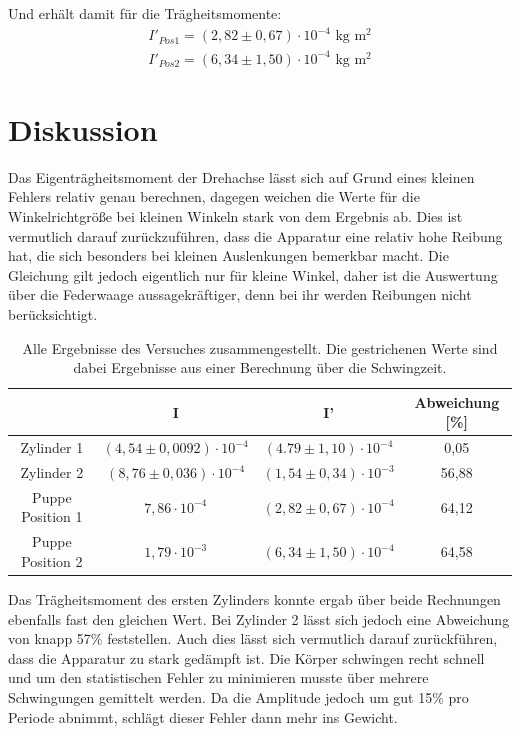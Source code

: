 Und erhält damit für die Trägheitsmomente:
\begin{align*}
I'_{Pos 1}=(2,82 \pm0,67)\cdot 10^{-4} \text{ kg m$^2$}\\
I'_{Pos 2}=(6,34 \pm1,50)\cdot 10^{-4} \text{ kg m$^2$}
\end{align*}

\section{Diskussion}
Das Eigenträgheitsmoment der Drehachse lässt sich auf Grund eines kleinen Fehlers relativ genau berechnen, dagegen weichen die Werte für die Winkelrichtgröße bei kleinen Winkeln stark von dem Ergebnis ab. Dies ist vermutlich darauf zurückzuführen, dass die Apparatur eine relativ hohe Reibung hat, die sich besonders bei kleinen Auslenkungen bemerkbar macht. Die Gleichung gilt jedoch eigentlich nur für kleine Winkel, daher ist die Auswertung über die Federwaage aussagekräftiger, denn bei ihr werden Reibungen nicht berücksichtigt.
\begin{table}[htbp]
\begin{tabular}{|c|c|c|c|}
\hline 
 & I & I' & Abweichung [\%] \\ \hline 
Zylinder 1 & $(4,54\pm0,0092)\cdot10^{-4}$ & $(4.79\pm1,10)\cdot10^{-4}$ & 0,05 \\ \hline 
Zylinder 2 & $(8,76\pm0,036)\cdot10^{-4}$ & $(1,54\pm0,34)\cdot10^{-3}$ & 56,88 \\ \hline 
Puppe Position 1 & $7,86\cdot 10^{-4}$ & $(2,82 \pm0,67)\cdot 10^{-4}$ & 64,12 \\ \hline 
Puppe Position 2 & $1,79\cdot 10^{-3}$ & $(6,34 \pm1,50)\cdot 10^{-4}$ & 64,58 \\ \hline 
\end{tabular} 
\caption{Alle Ergebnisse des Versuches zusammengestellt. Die gestrichenen Werte sind dabei Ergebnisse aus einer Berechnung über die Schwingzeit.}
\end{table}

Das Trägheitsmoment des ersten Zylinders konnte ergab über beide Rechnungen ebenfalls fast den gleichen Wert. Bei Zylinder 2 lässt sich jedoch eine Abweichung von knapp 57\% feststellen. Auch dies lässt sich vermutlich darauf zurückführen, dass die Apparatur zu stark gedämpft ist. Die Körper schwingen recht schnell und um den statistischen Fehler zu minimieren musste über mehrere Schwingungen gemittelt werden. Da die Amplitude jedoch um gut 15\% pro Periode abnimmt, schlägt dieser Fehler dann mehr ins Gewicht.

